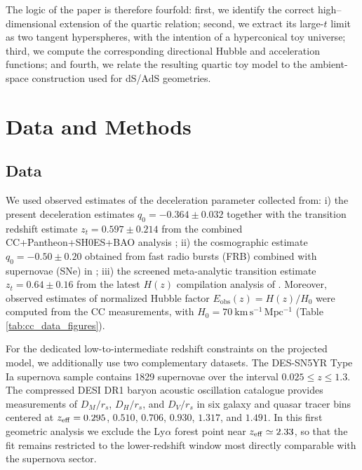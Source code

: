 \documentclass[11pt]{article}
\begin{document}
The logic of the paper is therefore fourfold: first, we identify the correct high--dimensional extension of the quartic relation; second, we extract its large-$t$ limit as two tangent hyperspheres, with the intention of a hyperconical toy universe; third, we compute the corresponding directional Hubble and acceleration functions; and fourth, we relate the resulting quartic toy model to the ambient-space construction used for dS/AdS geometries.


\section{Data and Methods}

\subsection{Data}

We used observed estimates of the deceleration parameter collected from: i) the present deceleration estimates $q_0=-0.364\pm0.032$ together with the transition redshift estimate $z_t=0.597\pm0.214$ from the combined CC+Pantheon+SH0ES+BAO analysis \cite{myrzakulov2025q0}; ii) the cosmographic estimate $q_0=-0.50\pm0.20$ obtained from fast radio bursts (FRB) combined with supernovae (SNe) in \cite{gao2024frb}; iii) the screened meta-analytic transition estimate $z_t=0.64\pm0.16$ from the latest $H(z)$ compilation analysis of \cite{hu2025transition}. Moreover, observed estimates of normalized Hubble factor $E_{\mathrm{obs}}(z)=H(z)/H_0$ were computed from the CC measurements, with $H_0=70~\mathrm{km\,s^{-1}\,Mpc^{-1}}$ (Table \ref{tab:cc_data_figures}).

For the dedicated low-to-intermediate redshift constraints on the projected model, we additionally use two complementary datasets. The DES-SN5YR Type Ia supernova sample \cite{abbott2024dark} contains 1829 supernovae over the interval $0.025 \le z \le 1.3$. The compressed DESI DR1 baryon acoustic oscillation catalogue \cite{adame2025desi} provides measurements of $D_M/r_s$, $D_H/r_s$, and $D_V/r_s$ in six galaxy and quasar tracer bins centered at $z_{\rm eff}=0.295$, $0.510$, $0.706$, $0.930$, $1.317$, and $1.491$. In this first geometric analysis we exclude the Ly$\alpha$ forest point near $z_{\rm eff}\simeq2.33$, so that the fit remains restricted to the lower-redshift window most directly comparable with the supernova sector.
\end{document}
